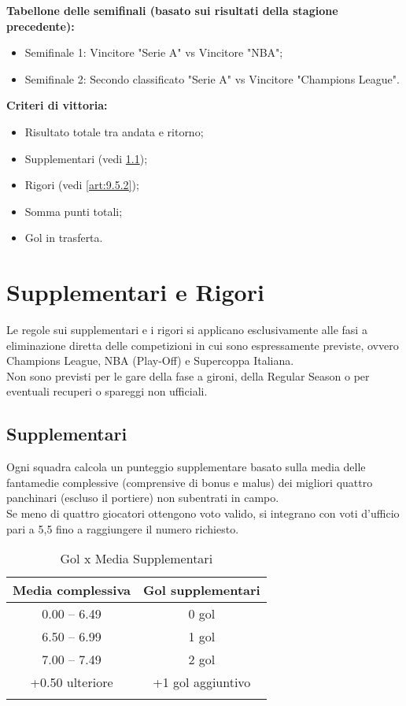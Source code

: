 \noindent\textbf{Tabellone delle semifinali (basato sui risultati della stagione precedente):}
\begin{itemize}
    \item Semifinale 1: Vincitore "Serie A" vs Vincitore "NBA";
    \item Semifinale 2: Secondo classificato "Serie A" vs Vincitore "Champions League".
\end{itemize}

\noindent \textbf{Criteri di vittoria:}
\begin{itemize}
\item Risultato totale tra andata e ritorno;
\item Supplementari (vedi \ref{art:9.5.1});
\item Rigori (vedi \ref{art:9.5.2});
\item Somma punti totali;
\item Gol in trasferta.
\end{itemize}


\section{Supplementari e Rigori}
\label{art:9.5}

Le regole sui supplementari e i rigori si applicano esclusivamente alle fasi a eliminazione diretta delle competizioni in cui sono espressamente previste, ovvero Champions League, NBA (Play-Off) e Supercoppa Italiana.\\
Non sono previsti per le gare della fase a gironi, della Regular Season o per eventuali recuperi o spareggi non ufficiali.

\subsection{Supplementari}
\label{art:9.5.1}

Ogni squadra calcola un punteggio supplementare basato sulla media delle fantamedie complessive (comprensive di bonus e malus) dei migliori quattro panchinari (escluso il portiere) non subentrati in campo.\\
Se meno di quattro giocatori ottengono voto valido, si integrano con voti d'ufficio pari a 5,5 fino a raggiungere il numero richiesto.

\begin{longtable}{|c|c|}
\hline
\textbf{Media complessiva} & \textbf{Gol supplementari} \\
\hline
0.00 -- 6.49 & 0 gol \\ \hline
6.50 -- 6.99 & 1 gol \\ \hline
7.00 -- 7.49 & 2 gol \\ \hline
+0.50 ulteriore & +1 gol aggiuntivo \\
\hline

\caption{Gol x Media Supplementari}
\end{longtable}

